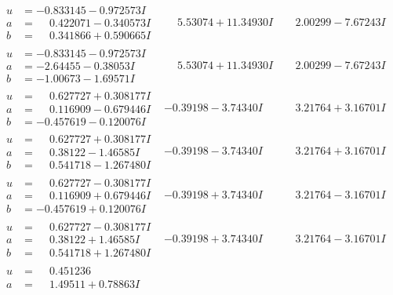 \documentclass[1p]{elsarticle_modified}
\theoremstyle{definition}
\begin{document}
$$\begin{array}{c|c|c}
 \hline 
\begin{aligned}
u &= -0.833145 - 0.972573 I \\
a &= \phantom{-}0.422071 - 0.340573 I \\
b &= \phantom{-}0.341866 + 0.590665 I\end{aligned}
 & \phantom{-}5.53074 + 11.34930 I & \phantom{-}2.00299 - 7.67243 I \\ \hline\begin{aligned}
u &= -0.833145 - 0.972573 I \\
a &= -2.64455 - 0.38053 I \\
b &= -1.00673 - 1.69571 I\end{aligned}
 & \phantom{-}5.53074 + 11.34930 I & \phantom{-}2.00299 - 7.67243 I \\ \hline\begin{aligned}
u &= \phantom{-}0.627727 + 0.308177 I \\
a &= \phantom{-}0.116909 - 0.679446 I \\
b &= -0.457619 - 0.120076 I\end{aligned}
 & -0.39198 - 3.74340 I & \phantom{-}3.21764 + 3.16701 I \\ \hline\begin{aligned}
u &= \phantom{-}0.627727 + 0.308177 I \\
a &= \phantom{-}0.38122 - 1.46585 I \\
b &= \phantom{-}0.541718 - 1.267480 I\end{aligned}
 & -0.39198 - 3.74340 I & \phantom{-}3.21764 + 3.16701 I \\ \hline\begin{aligned}
u &= \phantom{-}0.627727 - 0.308177 I \\
a &= \phantom{-}0.116909 + 0.679446 I \\
b &= -0.457619 + 0.120076 I\end{aligned}
 & -0.39198 + 3.74340 I & \phantom{-}3.21764 - 3.16701 I \\ \hline\begin{aligned}
u &= \phantom{-}0.627727 - 0.308177 I \\
a &= \phantom{-}0.38122 + 1.46585 I \\
b &= \phantom{-}0.541718 + 1.267480 I\end{aligned}
 & -0.39198 + 3.74340 I & \phantom{-}3.21764 - 3.16701 I \\ \hline\begin{aligned}
u &= \phantom{-}0.451236\phantom{ +0.000000I} \\
a &= \phantom{-}1.49511 + 0.78863 I \\

\end{aligned}
\end{array}$$
\end{document}
